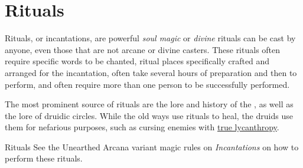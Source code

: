 \section{Rituals}
\label{sec:Rituals}

Rituals, or incantations, are powerful \emph{soul magic} or \emph{divine}
rituals can be cast by anyone, even those that are not arcane or divine
casters. These rituals often require specific words to be chanted, ritual
places specifically crafted and arranged for the incantation, often take
several hours of preparation and then to perform, and often require more than
one person to be successfully performed.

The most prominent source of rituals are the lore and history of the
, as well as the lore of druidic circles. While the old
ways use rituals to heal, the druids use them for nefarious purposes, such as
cursing enemies with \hyperref[sec:True Lycanthropes]{true lycanthropy}.

\begin{35e}{Rituals}
  See the Unearthed Arcana variant magic rules on \emph{Incantations} on how
  to perform these rituals.
\end{35e}






